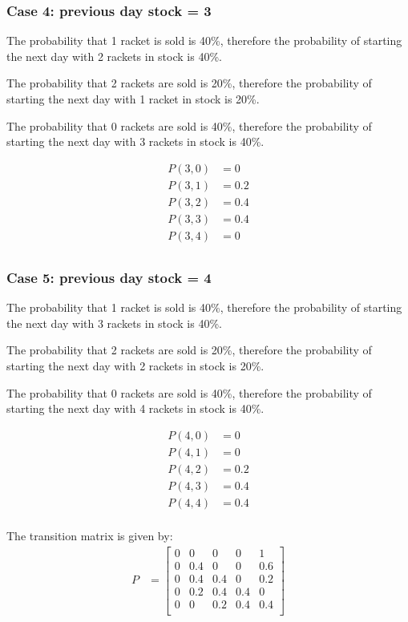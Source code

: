 \documentclass[12pt]{article}
\begin{document}
\begin{enumerate}
\begin{enumerate}
\subsubsection*{Case 4: previous day stock = 3}

The probability that 1 racket is sold is 40\%, therefore the probability of starting the next day with 2 rackets in stock is 40\%. 

The probability that 2 rackets are sold is 20\%, therefore the probability of starting the next day with 1 racket in stock is 20\%. 

The probability that 0 rackets are sold is 40\%, therefore the probability of starting the next day with 3 rackets in stock is 40\%.

\begin{align*}
P(3, 0) &= 0 \\
P(3, 1) &= 0.2 \\
P(3, 2) &= 0.4 \\
P(3, 3) &= 0.4 \\
P(3, 4) &= 0 \\
\end{align*}

\subsubsection*{Case 5: previous day stock = 4}
The probability that 1 racket is sold is 40\%, therefore the probability of starting the next day with 3 rackets in stock is 40\%.

The probability that 2 rackets are sold is 20\%, therefore the probability of starting the next day with 2 rackets in stock is 20\%.

The probability that 0 rackets are sold is 40\%, therefore the probability of starting the next day with 4 rackets in stock is 40\%.

\begin{align*}
P(4, 0) &= 0 \\
P(4, 1) &= 0 \\
P(4, 2) &= 0.2 \\
P(4, 3) &= 0.4 \\
P(4, 4) &= 0.4 \\
\end{align*}

The transition matrix is given by:
\begin{align*}
P &= \begin{bmatrix}
0 & 0 & 0 & 0 & 1 \\
0 & 0.4 & 0 & 0 & 0.6 \\
0 & 0.4 & 0.4 & 0 & 0.2 \\
0 & 0.2 & 0.4 & 0.4 & 0 \\
0 & 0 & 0.2 & 0.4 & 0.4 \\
\end{bmatrix}
\end{align*}


\end{enumerate}
\end{enumerate}
\end{document}
